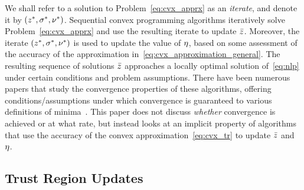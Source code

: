 \documentclass[letterpaper, 10 pt, conference]{ieeeconf}
\begin{document}
We shall refer to a solution to Problem~\eqref{eq:cvx_apprx} as an \textit{iterate}, and denote it by $(z^*,\sigma^*,\nu^*)$. Sequential convex programming algorithms iteratively solve Problem~\eqref{eq:cvx_apprx} and use the resulting iterate to update $\bar{z}$. Moreover, the iterate $(z^*,\sigma^*,\nu^*)$ is used to update the value of $\eta$, based on some assessment of the accuracy of the approximation in~\eqref{eq:cvx_approximation_general}. The resulting sequence of solutions $\bar{z}$ approaches a locally optimal solution of~\eqref{eq:nlp} under certain conditions and problem assumptions. There have been numerous papers that study the convergence properties of these algorithms, offering conditions/assumptions under which convergence is guaranteed to various definitions of minima~\cite{Mao2016a,Mao2018,Bonalli2019,Bonalli2019b}. This paper does not discuss \textit{whether} convergence is achieved or at what rate, but instead looks at an implicit property of algorithms that use the accuracy of the convex approximation~\eqref{eq:cvx_tr} to update $\bar{z}$ and $\eta$.

\subsection{Trust Region Updates}\label{subsec:tr_updates}
\end{document}
